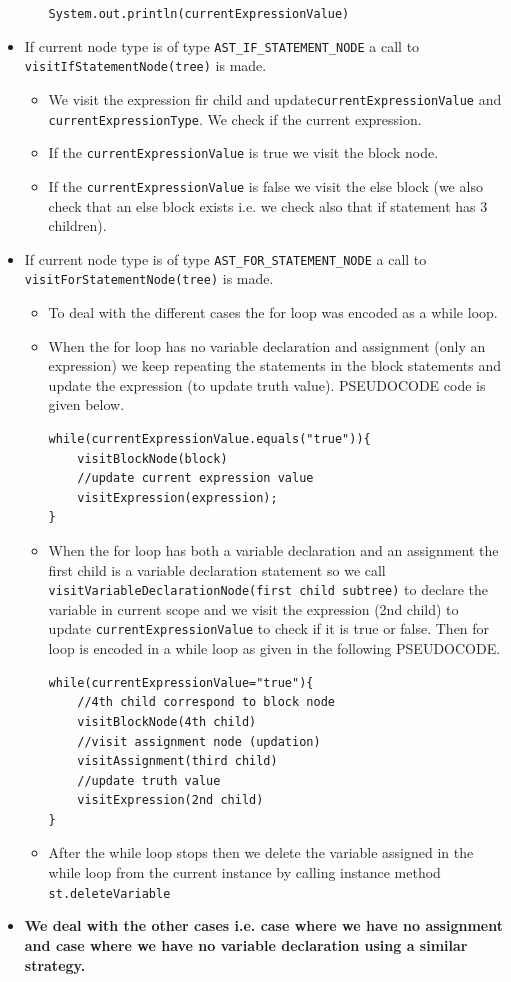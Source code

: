 \begin{itemize}
\begin{itemize}
        \verb!System.out.println(currentExpressionValue)!
    \end{itemize}
     \item If current node type is of type \verb!AST_IF_STATEMENT_NODE! a call to \verb!visitIfStatementNode(tree)! is made.
     \begin{itemize}
         \item We visit the expression fir child and update\verb!currentExpressionValue! and \verb!currentExpressionType!. We check if the current expression.
         \item If the \verb!currentExpressionValue! is true we visit the block node.
         \item If the \verb!currentExpressionValue! is false we visit the else block (we also check that an else block exists i.e. we check also that if statement has 3 children). 
     \end{itemize}
        \item If current node type is of type \verb!AST_FOR_STATEMENT_NODE! a call to \verb!visitForStatementNode(tree)! is made.
        \begin{itemize}
            \item To deal with the different cases the for loop was encoded as a while loop.
            \item When the for loop has no variable declaration and assignment (only an expression) we keep repeating the statements in the block statements and update the expression (to update truth value). PSEUDOCODE code is given below.
\begin{lstlisting}[caption={\emph{for(;expression;)\{...\}} encoded as while loop}]
while(currentExpressionValue.equals("true")){
    visitBlockNode(block)
    //update current expression value
    visitExpression(expression);
}
\end{lstlisting}
            \item When the for loop has both a variable declaration and an assignment the first child is a variable declaration statement so we call \verb!visitVariableDeclarationNode(first child subtree)! to declare the variable in current scope and we visit the expression (2nd child) to update \verb!currentExpressionValue! to check if it is true or false.
            Then for loop is encoded in a while loop as given in the following PSEUDOCODE.
\begin{lstlisting}[caption=\emph{for(declaration;expression;assignment)\{...\}}]
while(currentExpressionValue="true"){
    //4th child correspond to block node
    visitBlockNode(4th child)
    //visit assignment node (updation)
    visitAssignment(third child)
    //update truth value
    visitExpression(2nd child)
}
\end{lstlisting}
\item After the while loop stops then we delete the variable assigned in the while loop from the current instance by calling instance method \verb!st.deleteVariable!
\end{itemize}
\item \textbf{We deal with the other cases i.e. case where we have no assignment and case where we have no variable declaration using a similar strategy.}


\end{itemize}
